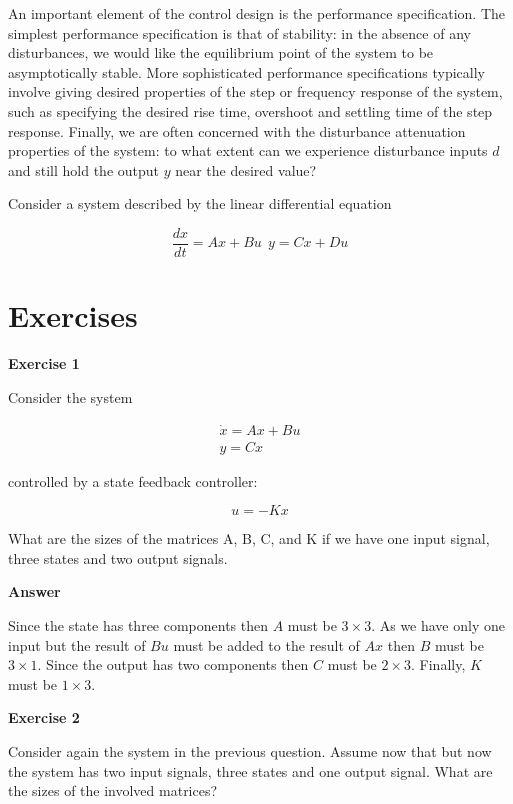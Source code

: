 An important element of the control design is the performance specification.
The simplest performance specification is that of stability: in the absence of any
disturbances, we would like the equilibrium point of the system to be asymptotically
stable. More sophisticated performance specifications typically involve giving desired properties of the step or frequency response of the system, such as specifying the desired rise time, overshoot and settling time of the step response. Finally, we are often concerned with the disturbance attenuation properties of the system: to
what extent can we experience disturbance inputs $d$ and still hold the output $y$ near the desired value?

Consider a system described by the linear differential equation



\begin{equation}
\frac{dx}{dt} = Ax + Bu ~~ y = Cx + Du
\end{equation}


\section{Exercises}

\textbf{Exercise 1}

Consider the system 

\begin{eqnarray}
\dot{x} = Ax + Bu \\
y = Cx 
\end{eqnarray}

controlled by a state feedback controller: 

\begin{equation}
 u = -Kx  
\end{equation}

What are  the sizes of the matrices A, B, C, and K if we have one input signal, three states and two output signals.

\textbf{Answer}

Since the state has three components then $A$ must be $3\times 3$. As we have only one input but the result of $Bu$ must be added to the result of $Ax$ then $B$ must be $3\times 1$.
Since the output has two components then $C$ must be $2\times 3$. Finally, $K$ must be $1\times 3$.

\textbf{Exercise 2}

Consider again the system in the previous  question. Assume now that but now the system has two input signals, three states and one output signal. What are the sizes of the involved matrices?

